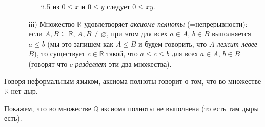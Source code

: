 \begin{definition}
\begin{enumerate}
\begin{itemize}
\begin{itemize}
              \item[ii.5] из $0 \le x$ и $0 \le y$ следует $0 \le xy$.
          \end{itemize}
          \item[iii)] Множество $\mathbb{R}$ удовлетворяет \textit{аксиоме полноты} (=непрерывности):
          если $A,B\subseteq \mathbb{R}$, $A,B \ne \varnothing$, при этом для всех $a\in A$, $b\in B$ выполняется $a \le b$ (мы это запишем как $A\le B$ и будем говорить, что \textit{$A$ лежит левее $B$}), то существует $c \in \mathbb{R}$ такой, что $a\le c \le b$ для всех $a\in A$, $b\in B$ (говорят что $c$ \textit{разделяет} эти два множества).
     \end{itemize}
\end{enumerate}
    
\end{definition}


Говоря неформальным языком, аксиома полноты говорит о том, что во множестве $\mathbb{R}$ нет дыр. 

Покажем, что во множестве $\mathbb{Q}$ аксиома полноты не выполнена (то есть там дыры есть).

